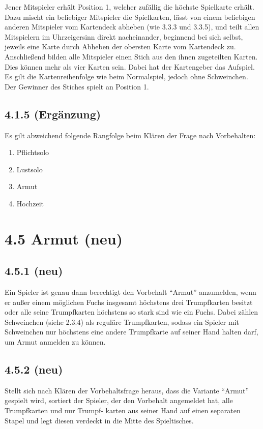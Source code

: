 Jener Mitspieler erhält Position 1, welcher zufällig die höchste 
Spielkarte erhält. Dazu mischt ein beliebiger Mitspieler die 
Spielkarten, lässt von einem beliebigen anderen Mitspieler vom 
Kartendeck abheben (wie 3.3.3 und 3.3.5), und teilt allen Mitspielern im 
Uhrzeigersinn direkt nacheinander, beginnend bei sich selbst, jeweils 
eine Karte durch Abheben der obersten Karte vom Kartendeck zu. 
Anschließend bilden alle Mitspieler einen Stich aus den ihnen 
zugeteilten Karten. Dies können mehr als vier Karten sein. Dabei hat 
der Kartengeber das Aufspiel. Es gilt die Kartenreihenfolge wie beim 
Normalspiel, jedoch ohne Schweinchen. Der Gewinner des Stiches spielt an 
Position 1. 

\subsection*{4.1.5 (Ergänzung)} 

Es gilt abweichend folgende Rangfolge beim Klären der Frage nach 
Vorbehalten: 

\begin{enumerate}
	\item Pflichtsolo
	\item Lustsolo
	\item Armut
	\item Hochzeit
\end{enumerate} 

\section*{4.5 Armut (neu)}

\subsection*{4.5.1 (neu)} 
 Ein Spieler ist genau dann berechtigt den Vorbehalt ``Armut'' 
anzumelden, wenn er außer einem möglichen Fuchs insgesamt höchstens 
drei Trumpfkarten besitzt oder alle seine Trumpfkarten höchstens so 
stark sind wie ein Fuchs. Dabei zählen Schweinchen (siehe 2.3.4) als 
reguläre Trumpfkarten, sodass ein Spieler mit Schweinchen nur 
höchstens eine andere Trumpfkarte auf seiner Hand halten darf, um Armut 
anmelden zu können. 

\subsection*{4.5.2 (neu)} 

Stellt sich nach Klären der Vorbehaltsfrage heraus, dass die Variante 
``Armut'' gespielt wird, sortiert der Spieler, der den Vorbehalt 
angemeldet hat, alle Trumpfkarten und nur Trumpf- karten aus seiner Hand 
auf einen separaten Stapel und legt diesen verdeckt in die Mitte des 
Spieltisches. 

